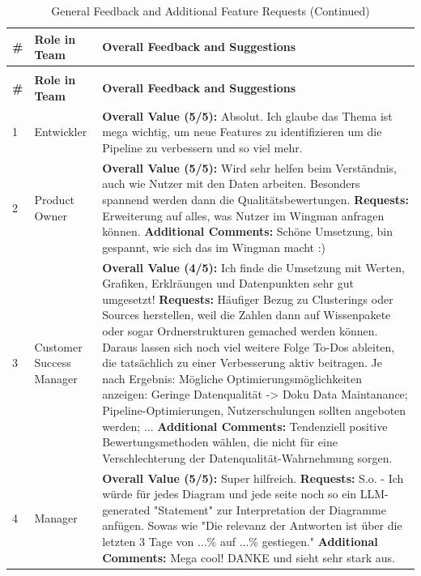 \documentclass[
	english,
	ruledheaders=section,%
	class=report,%
	thesis={type=bachelor},%
	accentcolor=1b,%
	custommargins=true,%
	marginpar=false,%
	parskip=half-,%
	fontsize=11pt,%
	DIV=14,
]{tudapub}
\begin{document}
\begin{longtable}{l >{\RaggedRight}p{3cm} >{\RaggedRight}p{10cm}}
    \caption{General Feedback and Additional Feature Requests}
    \label{tab:general_feedback}\\
    \toprule
    \textbf{\#} & \textbf{Role in Team} & \textbf{Overall Feedback and Suggestions} \\
    \midrule
    \endfirsthead
    \caption[]{General Feedback and Additional Feature Requests (Continued)}\\
    \toprule
    \textbf{\#} & \textbf{Role in Team} & \textbf{Overall Feedback and Suggestions} \\
    \midrule
    \endhead
    \bottomrule
    \endlastfoot

    1 & Entwickler & \textbf{Overall Value (5/5):} Absolut. Ich glaube das Thema ist mega wichtig, um neue Features zu identifizieren um die Pipeline zu verbessern und so viel mehr. \\
    \midrule
    2 & Product Owner & \textbf{Overall Value (5/5):} Wird sehr helfen beim Verständnis, auch wie Nutzer mit den Daten arbeiten. Besonders spannend werden dann die Qualitätsbewertungen. \textbf{Requests:} Erweiterung auf alles, was Nutzer im Wingman anfragen können. \textbf{Additional Comments:} Schöne Umsetzung, bin gespannt, wie sich das im Wingman macht :) \\
    \midrule
    3 & Customer Success Manager & \textbf{Overall Value (4/5):} Ich finde die Umsetzung mit Werten, Grafiken, Erklräungen und Datenpunkten sehr gut umgesetzt! \textbf{Requests:} Häufiger Bezug zu Clusterings oder Sources herstellen, weil die Zahlen dann auf Wissenpakete oder sogar Ordnerstrukturen gemached werden können. Daraus lassen sich noch viel weitere Folge To-Dos ableiten, die tatsächlich zu einer Verbesserung aktiv beitragen. Je nach Ergebnis: Mögliche Optimierungsmöglichkeiten anzeigen: Geringe Datenqualität -> Doku Data Maintanance; Pipeline-Optimierungen, Nutzerschulungen sollten angeboten werden; ... \textbf{Additional Comments:} Tendenziell positive Bewertungsmethoden wählen, die nicht für eine Verschlechterung der Datenqualität-Wahrnehmung sorgen. \\
    \midrule
    4 & Manager & \textbf{Overall Value (5/5):} Super hilfreich. \textbf{Requests:} S.o. - Ich würde für jedes Diagram und jede seite noch so ein LLM-generated "Statement" zur Interpretation der Diagramme anfügen. Sowas wie "Die relevanz der Antworten ist über die letzten 3 Tage von ...\% auf ...\% gestiegen." \textbf{Additional Comments:} Mega cool! DANKE und sieht sehr stark aus. \\

\end{longtable}
\end{document}
